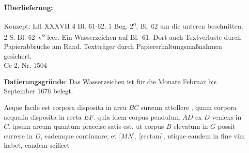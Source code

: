 \begin{ledgroupsized}[r]{120mm}
\footnotesize 
\pstart
\noindent
\textbf{\"{U}berlieferung:}
\pend
\end{ledgroupsized}
\begin{ledgroupsized}[r]{114mm}
\footnotesize 
\pstart
\parindent -6mm
Konzept: LH XXXVII 4 Bl. 61-62. 1 Bog. 2\textsuperscript{o}, Bl. 62 um die unteren  beschnitten. 2  S. Bl. 62~v\textsuperscript{o} leer. Ein Wasserzeichen auf Bl.~61. Dort auch Textverluste durch Papierabbrüche am Rand.
Textträger durch Papiererhaltungs\-ma{\ss}nahmen gesichert. \\Cc 2, Nr. 1504
\pend
\end{ledgroupsized}
%
\vspace*{5mm}
\begin{ledgroup}
\footnotesize 
\pstart
\noindent
\footnotesize{\textbf{Datierungsgr\"{u}nde}: Das Wasserzeichen ist für die Monate Februar bis September 1676 belegt.}
\pend
\end{ledgroup}
\vspace*{8mm}
\count{}
\pstart 
\normalsize
\noindent
[61~r\textsuperscript{o}]
Aeque facile est corpora disposita in arcu $\displaystyle BC$ sursum attollere
,
quam corpora aequalia disposita in recta $\displaystyle EF$. quia idem corpus pendulum\protect{} $\displaystyle AD$ ex $\displaystyle D$ 
veniens in $\displaystyle C$, ipsum arcum
quantum praecise satis est, ut corpus $\displaystyle B$ elevatum
in $\displaystyle G$ possit currere in $\displaystyle D$, eademque continuare;
et 
[$\displaystyle MN$],
[rectam],
utique eandem in fine vim habet, eandem scilicet\protect{}%
